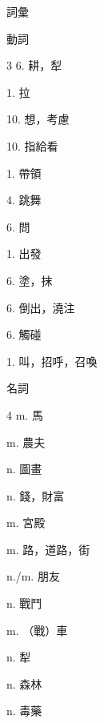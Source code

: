 \documentclass[aspectratio=169]{beamer}
\begin{document}
\begin{frame}{詞彙}
    \footnotesize
    \begin{block}{動詞}
        \begin{VocabCols}{3}
             6.  耕，犁
            
             1.  拉
            
             10.  想，考慮
            
             10.  指給看
            
             1.  帶領
            
             4.  跳舞
            
             6.  問
            
             1.  出發
            
             6.  塗，抹
            
             6.  倒出，澆注
            
             6.  觸碰
            
             1.  叫，招呼，召喚
        \end{VocabCols}
    \end{block}

    \begin{block}{名詞}
        \begin{VocabCols}{4}
             m. 馬
            
             m. 農夫
            
             n. 圖畫
            
             n. 錢，財富
            
             m. 宮殿
            
             m. 路，道路，街
            
             n./m. 朋友
            
             n. 戰鬥
            
             m. （戰）車
            
             n. 犁
            
             n. 森林
            
             n. 毒藥
            

\end{VocabCols}
\end{block}
\end{frame}
\end{document}
